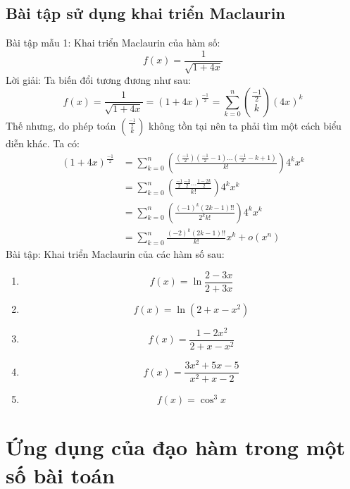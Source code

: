 \subsection{Bài tập sử dụng khai triển Maclaurin}
Bài tập mẫu 1: Khai triển Maclaurin của hàm số: $$f(x)=\frac{1}{\sqrt{1+4x}}$$
Lời giải: Ta biến đổi tương đương như sau:
\begin{equation*}
f(x)=\frac{1}{\sqrt{1+4x}}=(1+4x)^{\frac{-1}{2}}=\sum_{k=0}^{n}\binom{\frac{-1}{2}}{k}(4x)^k
\end{equation*}
Thế nhưng, do phép toán $\binom{\frac{-1}{2}}{k}$ không tồn tại nên ta phải tìm một cách biểu diễn khác. Ta có:
\begin{equation*}
\begin{split}
(1+4x)^{\frac{-1}{2}}&=\sum_{k=0}^{n}\left(\frac{(\frac{-1}{2})(\frac{-1}{2}-1)...(\frac{-1}{2}-k+1)}{k!}\right)4^kx^k\\&=\sum_{k=0}^{n}\left(\frac{\frac{-1}{2}\frac{-3}{2}...\frac{1-2k}{2}}{k!}\right)4^kx^k\\&=\sum_{k=0}^{n}\left(\frac{(-1)^k(2k-1)!!}{2^kk!}\right)4^kx^k\\&=\sum_{k=0}^{n}\frac{(-2)^k(2k-1)!!}{k!}x^k+o(x^n)
\end{split}
\end{equation*}
Bài tập: Khai triển Maclaurin của các hàm số sau:
\begin{enumerate}
    \item $$f(x)=\ln{\frac{2-3x}{2+3x}}$$
    \item $$f(x)=\ln{(2+x-x^2)}$$
    \item $$f(x)=\frac{1-2x^2}{2+x-x^2}$$
    \item $$f(x)=\frac{3x^2+5x-5}{x^2+x-2}$$
    \item $$f(x)=\cos^3{x}$$
\end{enumerate}
\section{Ứng dụng của đạo hàm trong một số bài toán}
